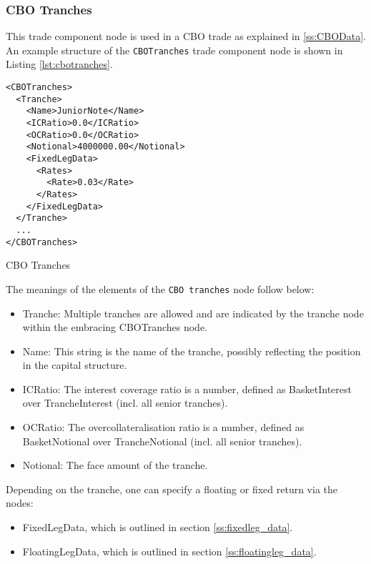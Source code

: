 \subsubsection{CBO Tranches}
\label{ss:cbotranches} 

This trade component node is used in a CBO trade as explained in \ref{ss:CBOData}.
An example structure of the \lstinline!CBOTranches! trade component node is shown in Listing \ref{lst:cbotranches}.

\begin{listing}[H]
\begin{verbatim}
<CBOTranches>
  <Tranche>
    <Name>JuniorNote</Name>
    <ICRatio>0.0</ICRatio>
    <OCRatio>0.0</OCRatio>
    <Notional>4000000.00</Notional>
    <FixedLegData>
      <Rates>
        <Rate>0.03</Rate>
      </Rates>
    </FixedLegData>
  </Tranche>
  ...
</CBOTranches>

\end{verbatim}
\caption{CBO Tranches}
\label{lst:cbotranches}
\end{listing}

The meanings of the elements of the {\tt CBO tranches} node follow below:

\begin{itemize}
\item Tranche: Multiple tranches are allowed and are indicated by the tranche node within the embracing CBOTranches node. 

\item Name: This string is the name of the tranche, possibly reflecting the position in the capital structure.  

\item ICRatio: The interest coverage ratio is a number, defined as BasketInterest over TrancheInterest (incl. all senior tranches).

\item OCRatio: The overcollateralisation ratio is a number, defined as BasketNotional over TrancheNotional (incl. all senior tranches).

\item Notional: The face amount of the tranche.

\end{itemize}

Depending on the tranche, one can specify a floating or fixed return via the nodes:

\begin{itemize}
\item FixedLegData, which is outlined in section \ref{ss:fixedleg_data}.

\item FloatingLegData, which is outlined in section \ref{ss:floatingleg_data}.

\end{itemize}
